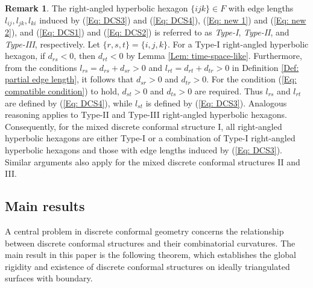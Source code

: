 \documentclass[12pt]{amsart}
\theoremstyle{definition}
\newtheorem{remark}[theorem]{Remark}
\begin{document}
\begin{remark}\label{Rmk: 3}
The right-angled hyperbolic hexagon $\{ijk\} \in F$ with edge lengths $l_{ij}, l_{jk}, l_{ki}$ induced by (\ref{Eq: DCS3}) and (\ref{Eq: DCS4}), (\ref{Eq: new 1}) and (\ref{Eq: new 2}), and (\ref{Eq: DCS1}) and (\ref{Eq: DCS2}) is referred to as \emph{Type-I}, \emph{Type-II}, and \emph{Type-III}, respectively.
Let $\{r, s, t\} = \{i, j, k\}$. 
For a Type-I right-angled hyperbolic hexagon, if $d_{rs} < 0$, then $d_{rt} < 0$ by Lemma \ref{Lem: time-space-like}.
Furthermore, from the conditions $l_{rs} = d_{rs} + d_{sr} > 0$ and $l_{rt} = d_{rt} + d_{tr} > 0$ in Definition \ref{Def: partial edge length}, it follows that $d_{sr} > 0$ and $d_{tr} > 0$. 
For the condition (\ref{Eq: compatible condition}) to hold, $d_{st} > 0$ and $d_{ts} > 0$ are required. 
Thus $l_{rs}$ and $l_{rt}$ are defined by (\ref{Eq: DCS4}), while $l_{st}$ is defined by (\ref{Eq: DCS3}).
Analogous reasoning applies to Type-II and Type-III right-angled hyperbolic hexagons. 
Consequently, for the mixed discrete conformal structure I, all right-angled hyperbolic hexagons are either Type-I or a combination of Type-I right-angled hyperbolic hexagons and those with edge lengths induced by (\ref{Eq: DCS3}). 
Similar arguments also apply for the mixed discrete conformal structures II and III.
\end{remark}


\subsection{Main results}

A central problem in discrete conformal geometry concerns the relationship between discrete conformal structures and their combinatorial curvatures. 
The main result in this paper is the following theorem, which establishes the global rigidity and existence of discrete conformal structures on ideally triangulated surfaces with boundary.
\end{document}
